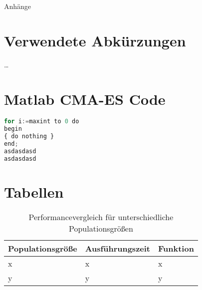 ﻿\begin{appendix}

\newpage
\huge{Anhänge}
\normalsize
\thispagestyle{plain}
\section{Verwendete Abkürzungen}
\dots{}

\newpage
\thispagestyle{plain}
\section{Matlab CMA-ES Code}
\label{lst:cmaes-mat-code}
\begin{lstlisting}[frame=single,language=Python]
for i:=maxint to 0 do
begin
{ do nothing }
end;
asdasdasd
asdasdasd
\end{lstlisting}



\newpage
\thispagestyle{plain}
\section{Tabellen}
  \label{tbl:population-compare}

    \begin{table}[h]
      \centering

    \begin{tabular}{lll}
	\hline
	\textbf{Populationsgröße} & \textbf{Ausführungszeit} & \textbf{Funktion}\\\hline
	x & x & x \\
	y & y & y \\

      \end{tabular}
    \caption{Performancevergleich für unterschiedliche Populationsgrößen}
    \end{table}

\end{appendix}
